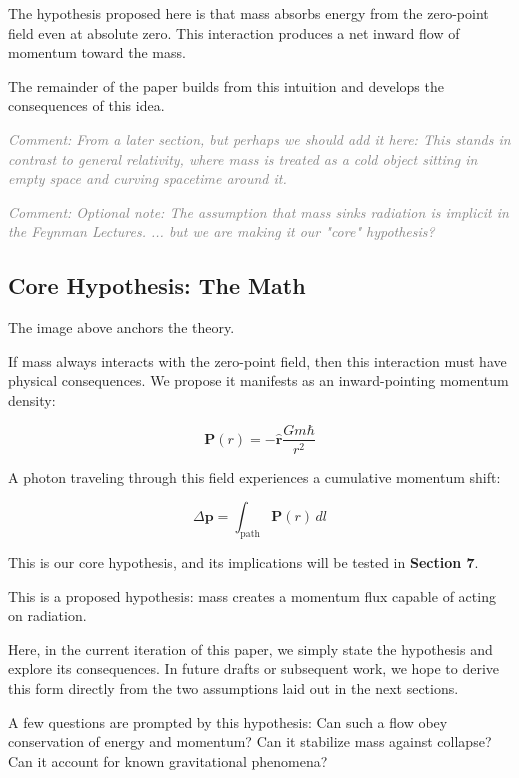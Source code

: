 \documentclass {article}
\renewcommand\vec{\mathbf}
\let\OldHat\hat
\renewcommand{\hat}[1]{\OldHat{\mathbf{#1}}}
\newcommand{\comment}[1]{\textcolor{gray}{\small\textit{Comment: #1}}}
\begin{document}
The hypothesis proposed here is that mass absorbs energy from the zero-point field even at absolute zero. This interaction produces a net inward flow of momentum toward the mass.

The remainder of the paper builds from this intuition and develops the consequences of this idea.

 \comment{From a later section, but perhaps we should add it here: This stands in contrast to general relativity, where mass is treated as a cold object sitting in empty space and curving spacetime around it.}

\comment{Optional note: The assumption that mass sinks radiation is implicit in the Feynman Lectures. ... but we are making it our "core" hypothesis?}

\subsection{Core Hypothesis: The Math}

The image above anchors the theory.

If mass always interacts with the zero-point field, then this interaction must have physical consequences. We propose it manifests as an inward-pointing momentum density:

\begin{equation}
\boxed{\vec{P}(r) = -\hat{r} \frac{G m \hbar}{r^2}}
\label{eq:hypothesis}
\end{equation}


A photon traveling through this field experiences a cumulative momentum shift:

\begin{equation}
\Delta \vec{p} = \int_{\text{path}} \vec{P}(r) \, dl
\label{eq:hypothesis2}
\end{equation}

This is our core hypothesis, and its implications will be tested in \textbf{Section 7}.

This is a proposed hypothesis: mass creates a momentum flux capable of acting on radiation. 

Here, in the current iteration of this paper, we simply state the hypothesis and explore its consequences. In future drafts or subsequent work, we hope to derive this form directly from the two assumptions laid out in the next sections.

A few questions are prompted by this hypothesis: Can such a flow obey conservation of energy and momentum? Can it stabilize mass against collapse? Can it account for known gravitational phenomena?
\end{document}
